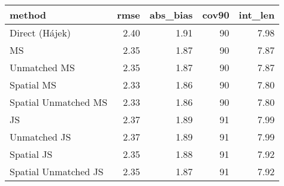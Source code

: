 
\begin{tabular}{lrrrr}
\toprule
method & rmse & abs\_bias & cov90 & int\_len\\
\midrule
Direct (Hájek) & 2.40 & 1.91 & 90 & 7.98\\
MS & 2.35 & 1.87 & 90 & 7.87\\
Unmatched MS & 2.35 & 1.87 & 90 & 7.87\\
Spatial MS & 2.33 & 1.86 & 90 & 7.80\\
Spatial Unmatched MS & 2.33 & 1.86 & 90 & 7.80\\
JS & 2.37 & 1.89 & 91 & 7.99\\
Unmatched JS & 2.37 & 1.89 & 91 & 7.99\\
Spatial JS & 2.35 & 1.88 & 91 & 7.92\\
Spatial Unmatched JS & 2.35 & 1.87 & 91 & 7.92\\
\bottomrule
\end{tabular}
